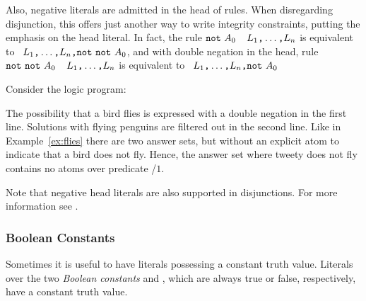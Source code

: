 Also, negative literals are admitted in the head of rules.
When disregarding disjunction,
this offers just another way to write integrity constraints,
putting the emphasis on the head literal.
In fact, the rule
\(\texttt{not}~A_0\)~\code{:-}~\(L_1\text{\texttt{,}}\dots\text{\texttt{,}}L_n\)
is equivalent to
\code{:-}~\(L_1\text{\texttt{,}}\dots\text{\texttt{,}}L_n\text{\texttt{,}}\texttt{not}~\texttt{not}~A_0\),
and with double negation in the head, rule
\(\texttt{not}~\texttt{not}~A_0\)~\code{:-}~\(L_1\text{\texttt{,}}\dots\text{\texttt{,}}L_n\)
is equivalent to
\code{:-}~\(L_1\text{\texttt{,}}\dots\text{\texttt{,}}L_n\text{\texttt{,}}\texttt{not}~A_0\)

\begin{example}\label{ex:as:flynn}
Consider the logic program:


The possibility that a bird flies is expressed with a double negation in the first line.
Solutions with flying penguins are filtered out in the second line.
Like in Example~\ref{ex:flies} there are two answer sets,
but without an explicit atom to indicate that a bird does not fly.
Hence, the answer set where tweety does not fly contains no atoms over predicate /$1$.
\end{example}

\begin{note}
  Note that negative head literals are also supported in disjunctions.
  For more information see \cite{litatu99a}.
\end{note}

\subsubsection{Boolean Constants}
%
Sometimes it is useful to have literals possessing a constant truth value.
Literals over the two \emph{Boolean constants}  and ,
which are always true or false, respectively,
have a constant truth value.

